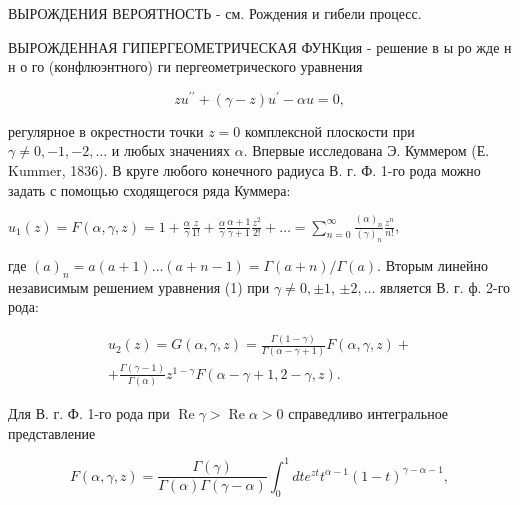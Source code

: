 \documentclass[10pt]{article}
\begin{document}
ВЫРОЖДЕНИЯ ВЕРОЯТНОСТЬ - см. Рождения и гибели процесс.



ВЫРОЖДЕННАЯ ГИПЕРГЕОМЕТРИЧЕСКАЯ ФУНКция - решение в ы ро жде н н о го (конфлюэнтного) ги пергеометрического уравнения



\[

z u^{\prime \prime}+(\gamma-z) u^{\prime}-\alpha u=0,

\]



регулярное в окрестности точки $z=0$ комплексной плоскости при $\gamma \neq 0,-1,-2, \ldots$ и любых значениях $\alpha$. Впервые исследована Э. Куммером (Е. Kummer, 1836). В круге любого конечного радиуса В. г. Ф. 1-го рода можно задать с помощью сходящегося ряда Куммера:



$u_{1}(z)=F(\alpha, \gamma, z)=1+\frac{\alpha}{\gamma} \frac{z}{1 !}+\frac{\alpha}{\gamma} \frac{\alpha+1}{\gamma+1} \frac{z^{2}}{2 !}+\ldots=\sum_{n=0}^{\infty} \frac{(\alpha)_{n}}{(\gamma)_{n}} \frac{z^{n}}{n !}$,



где $(a)_{n}=a(a+1) \ldots(a+n-1)=\Gamma(a+n) / \Gamma(a)$. Вторым линейно независимым решением уравнения (1) при $\gamma \neq 0, \pm 1$, $\pm 2, \ldots$ является В. г. ф. 2-го рода:



\[

\begin{gathered}

u_{2}(z)=G(\alpha, \gamma, z)=\frac{\Gamma(1-\gamma)}{\Gamma(\alpha-\gamma+1)} F(\alpha, \gamma, z)+ \\

+\frac{\Gamma(\gamma-1)}{\Gamma(\alpha)} z^{1-\gamma} F(\alpha-\gamma+1,2-\gamma, z) .

\end{gathered}

\]



Для В. г. Ф. 1-го рода при $\operatorname{Re} \gamma>\operatorname{Re} \alpha>0$ справедливо интегральное представление



\[

F(\alpha, \gamma, z)=\frac{\Gamma(\gamma)}{\Gamma(\alpha) \Gamma(\gamma-\alpha)} \int_{0}^{1} d t e^{z t} t^{\alpha-1}(1-t)^{\gamma-\alpha-1},

\]
\end{document}
